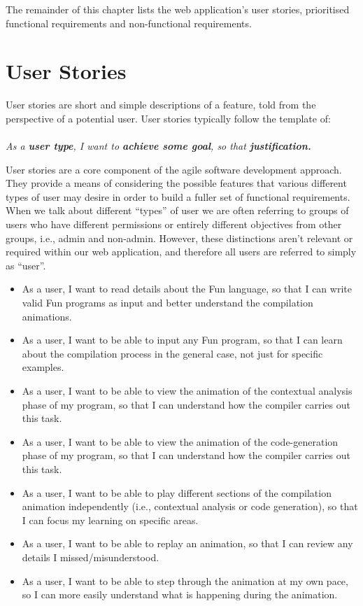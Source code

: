\documentclass{l4proj}
\begin{document}
The remainder of this chapter lists the web application's user stories, prioritised functional requirements and non-functional requirements.

\section{User Stories}
User stories are short and simple descriptions of a feature, told from the perspective of a potential user. User stories typically follow the template of:\\\\
\textit{As a \textbf{user type}, I want to \textbf{achieve some goal}, so that \textbf{justification.}}

User stories are a core component of the agile software development approach. They provide a means of considering the possible features that various different types of user may desire in order to build a fuller set of functional requirements. When we talk about different ``types'' of user we are often referring to groups of users who have different permissions or entirely different objectives from other groups, i.e., admin and non-admin. However, these distinctions aren't relevant or required within our web application, and therefore all users are referred to simply as ``user''.

\begin{itemize}
\item As a user, I want to read details about the Fun language, so that I can write valid Fun programs as input and better understand the compilation animations.
\item As a user, I want to be able to input any Fun program, so that I can learn about the compilation process in the general case, not just for specific examples.
\item As a user, I want to be able to view the animation of the contextual analysis phase of my program, so that I can understand how the compiler carries out this task.
\item As a user, I want to be able to view the animation of the code-generation phase of my program, so that I can understand how the compiler carries out this task.
\item As a user, I want to be able to play different sections of the compilation animation independently (i.e., contextual analysis or code generation), so that I can focus my learning on specific areas. 
\item As a user, I want to be able to replay an animation, so that I can review any details I missed/misunderstood.
\item As a user, I want to be able to step through the animation at my own pace, so I can more easily understand what is happening during the animation.
\end{itemize}
\end{document}
